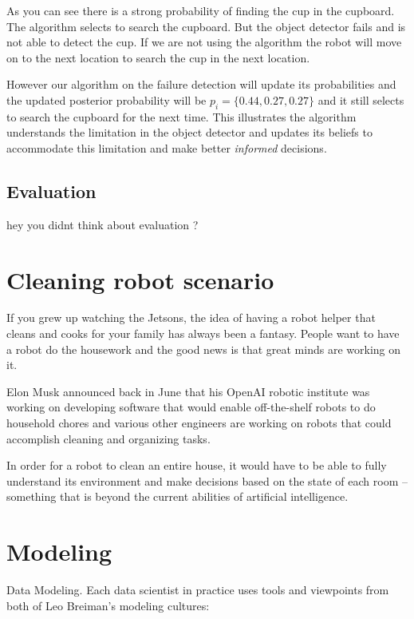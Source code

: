 \documentclass[11pt]{book}
\begin{document}
As you can see there is a strong probability of finding the cup in the cupboard. The algorithm selects to search the cupboard. But the object detector fails and is not able to detect the cup. If we are not using the algorithm the robot will move on to the next location to search the cup in the next location.



However our algorithm on the failure detection will update its probabilities and the updated posterior probability will be $ p_i = \{ 0.44, 0.27, 0.27\}$ and it still selects to search the cupboard for the next time. This illustrates the algorithm understands the limitation in the object detector and updates its beliefs to accommodate this limitation and make better \emph{informed} decisions.  

 
\section{Evaluation}
hey you didnt think about evaluation ? 

\chapter{Cleaning robot scenario}

If you grew up watching the Jetsons, the idea of having a robot helper that cleans and cooks for your family has always been a fantasy. People want to have a robot do the housework and the good news is that great minds are working on it.

Elon Musk announced back in June that his OpenAI robotic institute was working on developing software that would enable off-the-shelf robots to do household chores and various other engineers are working on robots that could accomplish cleaning and organizing tasks.

 In order for a robot to clean an entire house, it would have to be able to fully understand its environment and make decisions based on the state of each room -- something that is beyond the current abilities of artificial intelligence. 
 \cite{http://www.treehugger.com/gadgets/want-robot-clean-your-house-youll-have-wait-bit-longer.html}
 
\chapter{Modeling}
Data Modeling.
Each data scientist in practice uses tools and viewpoints from
both
of
Leo Breiman's modeling cultures:
\end{document}
